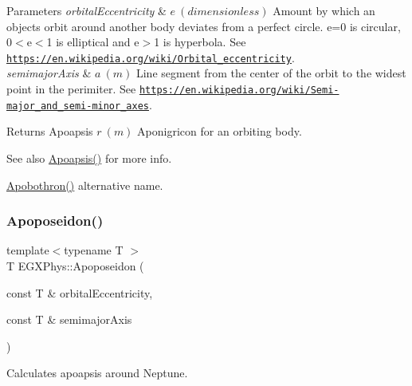 \begin{DoxyParams}{Parameters}
{\em orbital\+Eccentricity} & $ e\ (dimensionless)$ Amount by which an objects orbit around another body deviates from a perfect circle. e=0 is circular, 0$<$e$<$1 is elliptical and e$>$1 is hyperbola. See \href{https://en.wikipedia.org/wiki/Orbital_eccentricity}{\tt https\+://en.\+wikipedia.\+org/wiki/\+Orbital\+\_\+eccentricity}. \\
\hline
{\em semimajor\+Axis} & $ a\ (m)$ Line segment from the center of the orbit to the widest point in the perimiter. See \href{https://en.wikipedia.org/wiki/Semi-major_and_semi-minor_axes}{\tt https\+://en.\+wikipedia.\+org/wiki/\+Semi-\/major\+\_\+and\+\_\+semi-\/minor\+\_\+axes}. \\
\hline
\end{DoxyParams}
\begin{DoxyReturn}{Returns}
Apoapsis $ r\ (m)$ Aponigricon for an orbiting body. 
\end{DoxyReturn}
\begin{DoxySeeAlso}{See also}
\mbox{\hyperlink{group___e_g_x_phys-_apoapsis_gaf962e650bf84a568458e8eb39b1c61ba}{Apoapsis()}} for more info. 

\mbox{\hyperlink{group___e_g_x_phys-_apoapsis_ga6fe084b9e69f47a5032b05aa8f6bf7ad}{Apobothron()}} alternative name. 
\end{DoxySeeAlso}
\mbox{\label{group___e_g_x_phys-_apoapsis_ga89679654fff13176e989536163a27f9d}} 
\subsubsection{\texorpdfstring{Apoposeidon()}{Apoposeidon()}}
{\footnotesize\ttfamily template$<$typename T $>$ \\
T E\+G\+X\+Phys\+::\+Apoposeidon (\begin{DoxyParamCaption}\item[{const T \&}]{orbital\+Eccentricity,  }\item[{const T \&}]{semimajor\+Axis }\end{DoxyParamCaption})}



Calculates apoapsis around Neptune. 


